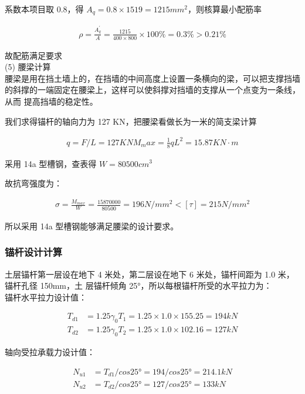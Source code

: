 系数本项目取 0.8，得 $A_q=0.8\times 1519=1215 mm^2$，则核算最小配筋率

\begin{align}
\label{fx:6.X}
\rho =\frac{A^{'}_q}{A}=\frac{1215}{400\times800}\times 100\% =0.3\% > 0.21\% 
\end{align}

故配筋满足要求\\

(5) 腰梁计算\\

腰梁是用在挡土墙上的，在挡墙的中间高度上设置一条横向的梁，可以把支撑挡墙
的斜撑的一端固定在腰梁上，这样可以使斜撑对挡墙的支撑从一个点变为一条线，从而
提高挡墙的稳定性。

我们求得锚杆的轴向力为 127 KN，把腰梁看做长为一米的简支梁计算

\begin{align*}
q=F/L=127KN
M_max=\frac{1}{8}qL^2=15.87KN\cdot m
\end{align*}

采用 14a 型槽钢，查表得 $W=80500cm^3$

故抗弯强度为：

\begin{align}
    \sigma =\frac{M_{max}}{W}=\frac{15870000}{80500}=196 N/mm^2 < [\tau]=215 N/mm^2
\end{align}

所以采用 14a 型槽钢能够满足腰梁的设计要求。\\

\subsubsection{锚杆设计计算}

土层锚杆第一层设在地下 4 米处，第二层设在地下 6 米处，锚杆间距为 1.0 米，锚杆孔径 150mm，土
层锚杆倾角 25°，所以每根锚杆所受的水平拉力为：\\

锚杆水平拉力设计值：

\begin{align}
 T_{d1}&=1.25\gamma_0T_1=1.25×1.0×155.25=194kN\\
 T_{d2}&=1.25\gamma_0T_2=1.25×1.0×102.16=127kN
\end{align}

轴向受拉承载力设计值： 

\begin{align}
N_{u1}&=T_{d1}/cos25°=194/cos25°=214.1kN\\
N_{u2}&=T_{d2}/cos25°=127/cos25°=133kN
\end{align}

